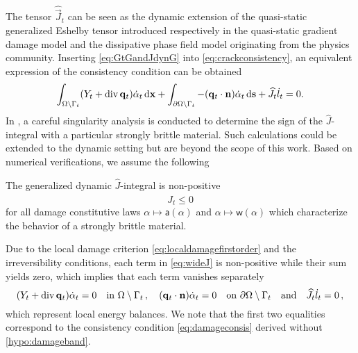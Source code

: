 The tensor $\widehat{\vec{J}}_t$ can be seen as the dynamic extension of the quasi-static generalized Eshelby tensor \cite{SicsicMarigo:2013,HakimKarma:2009} introduced respectively in the quasi-static gradient damage model and the dissipative phase field model originating from the physics community. Inserting \eqref{eq:GtGandJdynG} into \eqref{eq:crackconsistency}, an equivalent expression of the consistency condition can be obtained
\begin{equation} \label{eq:wideJ}
\int_\domaint(Y_t+\div\vec{q}_t)\dot{\alpha}_t\dx+\int_{\partial\Omega\setminus\Gamma_t}-(\vec{q}_t\cdot\vec{n})\dot{\alpha}_t\ds+\widehat{J}_t\dot{l}_t=0.
\end{equation}
In \cite{SicsicMarigo:2013}, a careful singularity analysis is conducted to determine the sign of the $\widehat{J}$-integral with a particular strongly brittle material. Such calculations could be extended to the dynamic setting but are beyond the scope of this work. Based on numerical verifications, we assume the following
\begin{hypothesis} \label{eq:Jleq0}
The generalized dynamic $\widehat{J}$-integral is non-positive
\begin{equation} \label{eq:stab}
\widehat{J}_t\leq 0
\end{equation}
for all damage constitutive laws $\alpha\mapsto\mathsf{a}(\alpha)$ and $\alpha\mapsto\mathsf{w}(\alpha)$ which characterize the behavior of a strongly brittle material.
\end{hypothesis}
Due to the local damage criterion \eqref{eq:localdamagefirstorder} and the irreversibility conditions, each term in \eqref{eq:wideJ} is non-positive while their sum yields zero, which implies that each term vanishes separately
\begin{equation} \label{eq:ebG}
(Y_t+\div\vec{q}_t)\dot{\alpha}_t=0\quad\text{in }\domaint\,,\quad(\vec{q}_t\cdot\vec{n})\dot{\alpha}_t=0\quad\text{on }\partial\Omega\setminus\Gamma_t\quad\text{and}\quad\widehat{J}_t\dot{l}_t=0\,,
\end{equation}
which represent local energy balances. We note that the first two equalities correspond to the consistency condition \eqref{eq:damageconsis} derived without \cref{hypo:damageband}.

